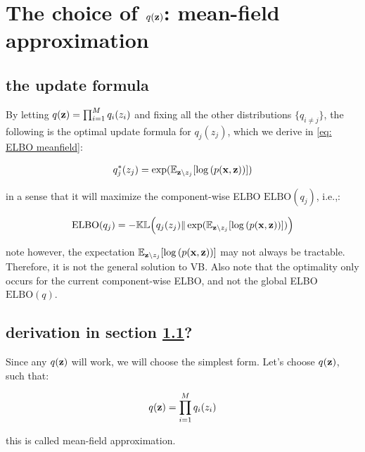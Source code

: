 \documentclass{article}
\begin{document}
\section{The choice of $q({\mathbf z})$: mean-field approximation}

\subsection{the update formula}\label{sec: the goal}

By letting $q({\mathbf z}) = \prod_{i=1}^M q_i(z_i)$ and fixing all the other distributions $\{ q_{i \ne j} \}$, the following is the optimal update formula for $q_j(z_j)$, which we derive in \ref{eq: ELBO meanfield}:

\begin{equation}\begin{split}
	q_j^*(z_j) &= \exp(\mathbb{E}_{{\mathbf z} \setminus z_j} [ \log{(p({\mathbf x},{\mathbf z}))} ])\\ 
\end{split}\end{equation}

in a sense that it will maximize the component-wise ELBO $\text{ELBO}(q_j)$, i.e.,:

\begin{equation}\begin{split}
	 \text{ELBO}(q_j) &= - \mathbb{KL} \Big( q_j(z_j) \| \exp(\mathbb{E}_{{\mathbf z} \setminus z_j} [ \log{(p({\mathbf x},{\mathbf z}))} ])  \Big)\\
\end{split}\end{equation}

note however, the expectation $\mathbb{E}_{{\mathbf z} \setminus z_j} [ \log{(p({\mathbf x},{\mathbf z}))} ]$ may not always be tractable. Therefore, it is not the general solution to VB. Also note that the optimality only occurs for the current component-wise ELBO, and not the global ELBO $\text{ELBO}(q)$.

\subsection{derivation in section \ref{sec: the goal}?}

Since any $q({\mathbf z})$ will work, we will choose the simplest form. Let's choose $q({\mathbf z})$, such that:

\begin{equation}
 q({\mathbf z}) = \prod_{i=1}^M q_i(z_i)
\end{equation}

this is called mean-field approximation.
\end{document}
